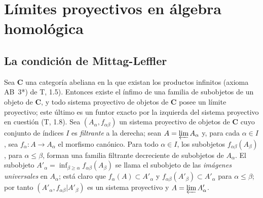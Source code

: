 \section{Límites proyectivos en álgebra homológica}
\label{section:0.13}
\label{section:0.13-fr}

\subsection{La condición de Mittag-Leffler}
\label{subsection:0.13.1}
\label{subsection:0.13.1-fr}

\begin{env}[13.1.1]
\label{0.13.1.1}
\label{0.13.1.1-fr}
Sea $\boldsymbol{C}$ una categoría abeliana en la que existan los productos
infinitos (axioma AB~3*) de T, 1.5).
Entonces existe el ínfimo de una familia de subobjetos de un objeto de
$\boldsymbol{C}$, y todo sistema proyectivo de objetos de $\boldsymbol{C}$ posee un
límite proyectivo; este último es un funtor exacto por la izquierda del
sistema proyectivo en cuestión (T, 1.8).
Sea $(A_\alpha,f_{\alpha\beta})$ un sistema proyectivo de objetos de
$\boldsymbol{C}$ cuyo conjunto de índices $I$ es \emph{filtrante} a la derecha; sean $A=\varprojlim A_\alpha$
y, para cada $\alpha\in I$, sea
$f_\alpha:A\to A_\alpha$ el morfismo canónico.
Para todo $\alpha\in I$, los subobjetos
$f_{\alpha\beta}(A_\beta)$, para $\alpha\leq\beta$, forman una familia
filtrante decreciente de subobjetos de $A_\alpha$.
El subobjeto
$A'_\alpha=\inf_{\beta\geq\alpha}f_{\alpha\beta}(A_\beta)$
se llama el subobjeto de las \emph{imágenes universales} en $A_\alpha$; está claro que $f_\alpha(A)\subset A'_\alpha$ y $f_{\alpha\beta}(A'_\beta)\subset A'_\alpha$ para $\alpha\leq\beta$; por tanto
$(A'_\alpha,f_{\alpha\beta}|A'_\beta)$ es un sistema proyectivo y
$A=\varprojlim A'_\alpha$.
\end{env}

